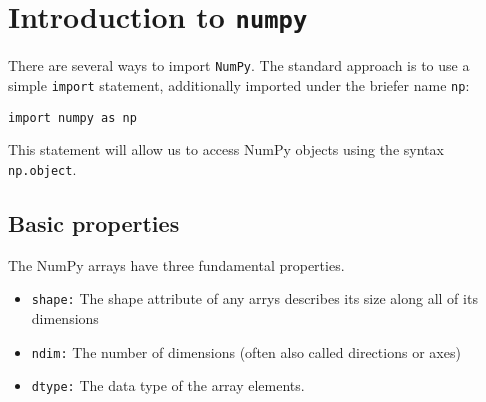 \documentclass[numpymain.tex]{subfiles}
\begin{document}
\section{Introduction to \texttt{numpy} }


There are several ways to import \texttt{NumPy}. 
The standard approach is to use a simple \texttt{import} 
statement, additionally imported under the briefer name \texttt{np}:

\begin{framed}
\begin{verbatim}
import numpy as np
\end{verbatim}
\end{framed}

This statement will allow us to access NumPy objects using the syntax \texttt{np.object}.


\subsection{Basic properties}
The NumPy arrays have three fundamental properties.

\begin{itemize}
\item \texttt{shape:} The shape attribute of any arrys describes its size
along all of its dimensions

\item \texttt{ndim:} The number of dimensions (often also called directions or axes)

\item \texttt{dtype:} The data type of the array elements.
\end{itemize}
\end{document}
